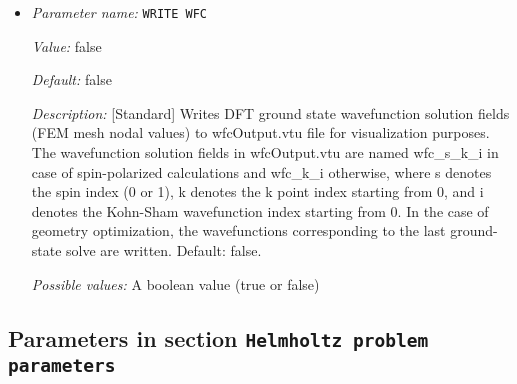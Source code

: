 \begin{itemize}
{\it Value:} false


{\it Default:} false


{\it Description:} [Standard] Computes projected density of states on each atom using Lorentzians. Uses specified Temperature for SCF as the broadening parameter. Outputs a file name 'pdosData\_x' with x denoting atomID. This file contains columns with first column indicating the energy in eV and all other columns indicating projected density of states corresponding to single atom wavefunctions.


{\it Possible values:} A boolean value (true or false)
\item {\it Parameter name:} {\tt WRITE WFC}
\label{parameters:Ground_2dstate derived computations/WRITE WFC}
\label{parameters:Ground_2dstate_20derived_20computations/WRITE_20WFC}


{\it Value:} false


{\it Default:} false


{\it Description:} [Standard] Writes DFT ground state wavefunction solution fields (FEM mesh nodal values) to wfcOutput.vtu file for visualization purposes. The wavefunction solution fields in wfcOutput.vtu are named wfc\_s\_k\_i in case of spin-polarized calculations and wfc\_k\_i otherwise, where s denotes the spin index (0 or 1), k denotes the k point index starting from 0, and i denotes the Kohn-Sham wavefunction index starting from 0. In the case of geometry optimization, the wavefunctions corresponding to the last ground-state solve are written.  Default: false.


{\it Possible values:} A boolean value (true or false)
\end{itemize}

\subsection{Parameters in section \tt Helmholtz problem parameters}
\label{parameters:Helmholtz_20problem_20parameters}

